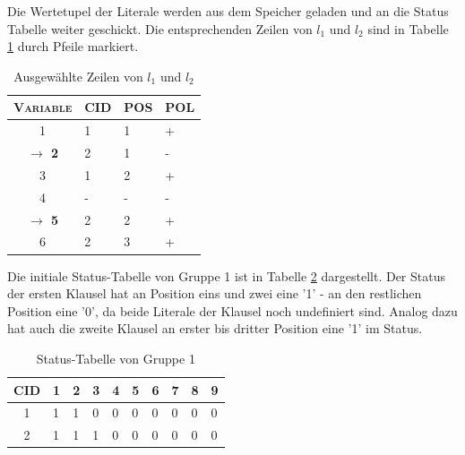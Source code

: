 Die Wertetupel der Literale werden aus dem Speicher geladen
und an die Status Tabelle weiter geschickt. Die entsprechenden
Zeilen von $l_1$ und $l_2$ sind in Tabelle \ref{bsp_literal_lookup2}
durch Pfeile markiert.
\begin{table}[h]
  \centering
  \begin{tabular}{|c|l|l|l|}
    \hline
    \textsc{Variable} & \textsc{CID} & \textsc{POS} & \textsc{POL}\\
    \hline
    \hline
     1 & 1 & 1 & + \\
    \hline
    \textbf{$\rightarrow$ 2} & 2 & 1 & - \\
    \hline
    3 & 1 & 2 & + \\
    \hline
    4 & - & - & - \\
    \hline
    \textbf{$\rightarrow$ 5} & 2 & 2 & + \\
    \hline
    6 & 2 & 3 & + \\
    \hline
  \end{tabular}
  \caption{Ausgewählte Zeilen von $l_1$ und $l_2$}
  \label{bsp_literal_lookup2}
\end{table}
Die initiale Status-Tabelle von Gruppe 1 ist in Tabelle \ref{bsp_literal_lookup3}
dargestellt. Der Status der ersten Klausel hat an Position eins und zwei eine '1'
- an den restlichen Position eine '0', da beide Literale der Klausel noch
undefiniert sind. Analog dazu hat auch die zweite Klausel an erster bis dritter
Position eine '1' im Status.
\begin{table}[h]
  \centering
  \begin{tabular}{|c|l|l|l|l|l|l|l|l|l|}
    \hline
    \textsc{CID} & \textsc{1} & \textsc{2} & \textsc{3}& \textsc{4}& \textsc{5}& \textsc{6}& \textsc{7}& \textsc{8}& \textsc{9}\\
    \hline
    \hline
    1 & 1& 1& 0& 0& 0& 0& 0& 0& 0 \\
    \hline
    2 & 1& 1& 1& 0& 0& 0& 0& 0& 0 \\
    \hline
  \end{tabular}
  \caption{Status-Tabelle von Gruppe 1}
  \label{bsp_literal_lookup3}
\end{table}

